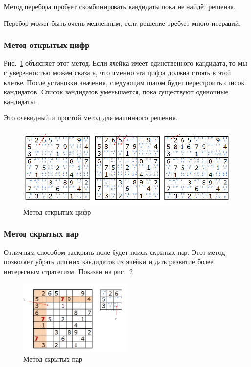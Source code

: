 Метод перебора пробует скомбинировать кандидаты пока не найдёт решения. 

Перебор может быть очень медленным, если решение требует много итераций. 

\subsubsection*{Метод открытых цифр}
Рис.~\ref{fig:fig07}  объясняет этот метод. Если ячейка имеет единственного кандидата, то мы с уверенностью можем сказать, что именно эта цифра должна стоять в этой клетке. После установки значения, следующим шагом будет перестроить список кандидатов. Список кандидатов уменьшается, пока существуют одиночные кандидаты.

Это очевидный и простой метод для машинного решения.

\begin{figure}[ht!]
 \centering 
 \includegraphics[width=\textwidth]{inc/raster/analysis1-7.png} 
 \caption{Метод открытых цифр} 
 \label{fig:fig07} 
\end{figure}


\subsubsection*{Метод скрытых пар}

Отличным способом раскрыть поле будет поиск скрытых пар. Этот метод позволяет убрать лишних кандидатов из ячейки и дать развитие более интересным стратегиям. Показан на рис.~\ref{fig:fig08}
\begin{figure}[ht!]
 \centering 
 \includegraphics[width=0.5\textwidth]{inc/raster/analysis1-8.png} 
 \caption{Метод скрытых пар} 
 \label{fig:fig08} 
\end{figure}

